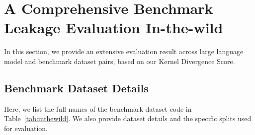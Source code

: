 \section{A Comprehensive Benchmark Leakage Evaluation In-the-wild}
\label{apdx:inthewild}
In this section, we provide an extensive evaluation result across large language model and benchmark dataset pairs, based on our Kernel Divergence Score.


\subsection{Benchmark Dataset Details}
Here, we list the full names of the benchmark dataset code in Table~\ref{tab:inthewild}.
We also provide dataset details and the specific splits used for evaluation.

